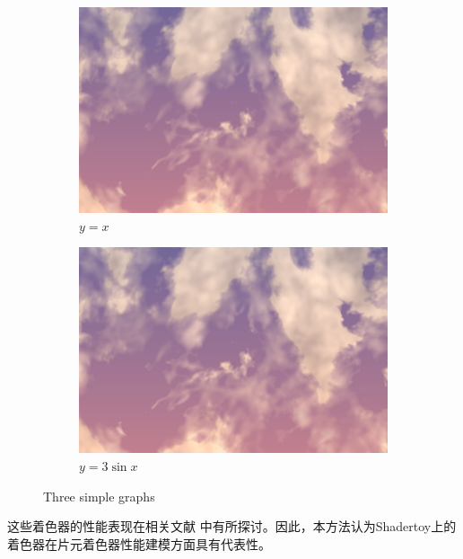\begin{figure}[htbp]
     \centering
     \begin{subfigure}[b]{300}
         \centering
         \includegraphics[width=\textwidth]{figures/shadertoy_cloud.png}
         \caption{$y=x$}
         \label{fig:y equals x}
     \end{subfigure}
     \hfill
     \begin{subfigure}[b]{300}
         \centering
         \includegraphics[width=\textwidth]{figures/shadertoy_cloud.png}
         \caption{$y=3\sin x$}
         \label{fig:three sin x}
     \end{subfigure}
        \caption{Three simple graphs}
        \label{fig:three graphs}
\end{figure}


这些着色器的性能表现在相关文献 \cite{https://doi.org/10.1111/cgf.14457} 中有所探讨。因此，本方法认为Shadertoy上的着色器在片元着色器性能建模方面具有代表性。

